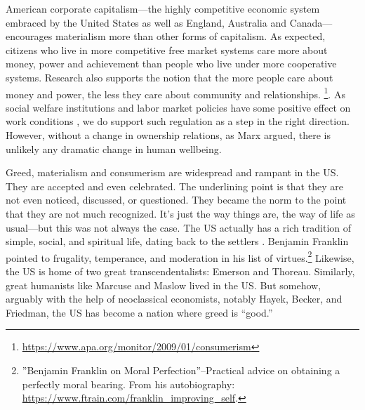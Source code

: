 \documentclass[10pt, letterpaper]{article}
\begin{document}
\begin{spacing}{1.8}
American corporate capitalism---the highly competitive economic system embraced by the United States as well as England, Australia and Canada---encourages
materialism more than other forms of capitalism.
%
As expected, citizens who live in more competitive free market systems care more about money, power and achievement than people who live under more cooperative systems. Research also supports the notion that the more people care about money and power, the less they care about community and relationships.
\footnote{\url{https://www.apa.org/monitor/2009/01/consumerism}}.
 As social welfare institutions and labor market policies have some positive
 effect on work conditions \citep{inanc20}, we do support such regulation as a step in the
 right direction. However, without a change in ownership relations,
 as Marx argued, there is unlikely any dramatic change in human wellbeing. %


Greed, materialism and consumerism are widespread and rampant in the US. They
are accepted and even celebrated. The underlining point is that they are not even
noticed, discussed, or questioned. They became the norm to the point
that they are not much recognized. It's just the way things are, the way of life
as usual---but this was not always the case. The US actually has a rich
tradition of simple, social, and spiritual life, dating back to the settlers
\citep{fischer91}. Benjamin Franklin pointed to frugality, temperance, and
moderation in his list of virtues.\footnote{''Benjamin Franklin on Moral
  Perfection''--Practical advice on obtaining a perfectly moral bearing. From
  his autobiography: \url{https://www.ftrain.com/franklin_improving_self}.}
Likewise,  the US is home of two great transcendentalists: Emerson and Thoreau.
Similarly, great humanists like Marcuse and Maslow lived in the US. But somehow, arguably with the help of neoclassical economists, notably Hayek, Becker, and Friedman, the US has become a nation where greed is ``good.''


\end{spacing}
\end{document}
